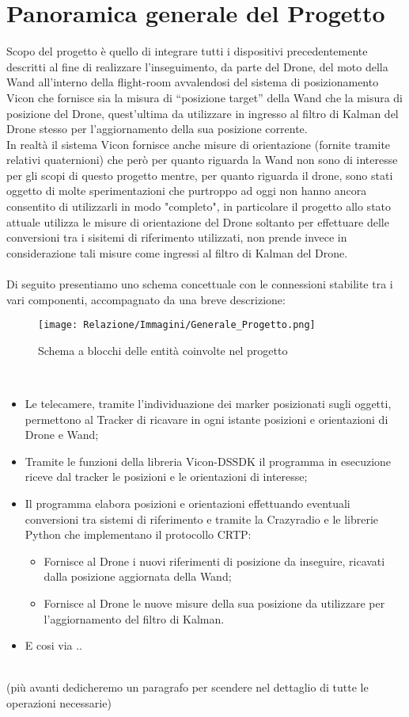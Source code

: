 \chapter*{Panoramica generale del Progetto}

Scopo del progetto è quello di integrare tutti i dispositivi precedentemente descritti al fine di realizzare l’inseguimento, da parte del Drone, del moto della Wand all’interno della flight-room avvalendosi del sistema di posizionamento Vicon che fornisce sia la misura di “posizione target” della Wand che la misura di posizione del Drone, quest’ultima da utilizzare in ingresso al filtro di Kalman del Drone stesso per l'aggiornamento della sua posizione corrente. \\
In realtà il sistema Vicon fornisce anche misure di orientazione (fornite tramite relativi quaternioni) che però per quanto riguarda la Wand non sono di interesse per gli scopi di questo progetto mentre, per quanto riguarda il drone, sono stati oggetto di molte sperimentazioni che purtroppo ad oggi non hanno ancora consentito di utilizzarli in modo "completo", in particolare il progetto allo stato attuale utilizza le misure di orientazione del Drone soltanto per effettuare delle conversioni tra i sisitemi di riferimento utilizzati, non prende invece in considerazione tali misure come ingressi al filtro di Kalman del Drone. \\
\\
Di seguito presentiamo uno schema concettuale con le connessioni stabilite tra i vari componenti, accompagnato da una breve descrizione:
\begin{figure}[h]
    \centering
    \texttt{[image: Relazione/Immagini/Generale\_Progetto.png]}
    \caption{Schema a blocchi delle entità coinvolte nel progetto}
    \label{fig:Generale_Progetto}
\end{figure}
\\
\begin{itemize}
    \item Le telecamere, tramite l’individuazione dei marker posizionati sugli oggetti, permettono al Tracker di ricavare in ogni istante posizioni e orientazioni di Drone e Wand;
    \item Tramite le funzioni della libreria Vicon-DSSDK il programma in esecuzione riceve dal tracker le posizioni e le orientazioni di interesse;
    \item Il programma elabora posizioni e orientazioni effettuando eventuali conversioni tra sistemi di riferimento e tramite la Crazyradio e le librerie Python che implementano il protocollo CRTP:
    \begin{itemize}
        \item Fornisce al Drone i nuovi riferimenti di posizione da inseguire, ricavati dalla posizione aggiornata della Wand;
        \item Fornisce al Drone le nuove misure della sua posizione da utilizzare per l’aggiornamento del filtro di Kalman.
    \end{itemize}
    \item E cosi via .. 
\end{itemize}
\\
(più avanti dedicheremo un paragrafo per scendere nel dettaglio di tutte le operazioni necessarie)
